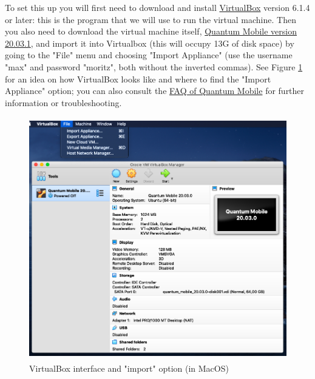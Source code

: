 \documentclass[12pt]{article}
\begin{document}
To set this up you will first need to download and install
\href{https://www.virtualbox.org/}{VirtualBox}
version 6.1.4 or later: this is the program that we will use to run the virtual
machine. Then you also need to download the virtual machine itself,
\href{https://github.com/marvel-nccr/quantum-mobile/releases/tag/20.03.1}
{Quantum Mobile version 20.03.1},
and import it into Virtualbox (this will occupy 13G of disk space) by going to the "File" menu and choosing "Import Appliance" (use the username "max" and password "moritz", both without the inverted commas).
See Figure \ref{import_vm} for an idea on how VirtualBox looks like and where
to find the "Import Appliance" option; you can also consult the
\href{https://github.com/marvel-nccr/quantum-mobile/wiki/Frequently-Asked-Questions}
{FAQ of Quantum Mobile}
for further information or troubleshooting.
\begin{figure}[h!]
\centering
\includegraphics[height=300pt]{import.png}
\caption{VirtualBox interface and "import" option (in MacOS)}
\label{import_vm}
\end{figure}
\end{document}
